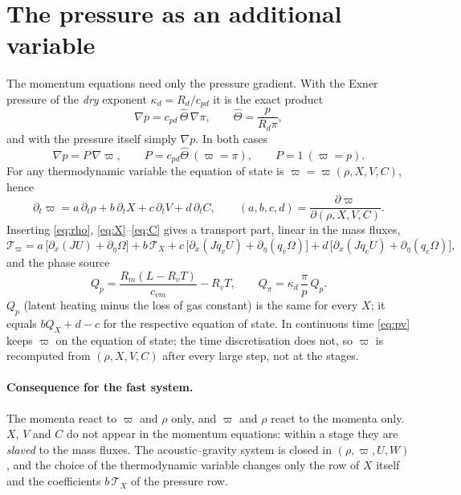 \documentclass[11pt,a4paper]{article}
\newcommand{\pv}{\varpi}      %
\begin{document}
\section{The pressure as an additional variable}\label{sec:pressure}
The momentum equations need only the pressure gradient. With the Exner pressure of the \emph{dry}
exponent $\kappa_d=R_d/c_{pd}$ it is the exact product
\[
\nabla p=c_{pd}\,\hat\Theta\,\nabla\pi,\qquad\hat\Theta=\frac p{R_d\pi},
\]
and with the pressure itself simply $\nabla p$. In both cases
\[
\nabla p=P\,\nabla\pv,\qquad P=c_{pd}\hat\Theta\ (\pv=\pi),\qquad P=1\ (\pv=p).
\]
For any thermodynamic variable the equation of state is $\pv=\pv(\rho,X,V,C)$, hence
\begin{equation}
\partial_t\pv=a\,\partial_t\rho+b\,\partial_tX+c\,\partial_tV+d\,\partial_tC,\qquad
(a,b,c,d)=\frac{\partial\pv}{\partial(\rho,X,V,C)} .\label{eq:chain}
\end{equation}
Inserting \eqref{eq:rho}, \eqref{eq:X}--\eqref{eq:C} gives a transport part, linear in the mass fluxes,
\[
\mathcal T_\pv=a\,\big[\partial_x(JU)+\partial_\eta\Omega\big]+b\,\mathcal T_X+c\,\big[\partial_x(Jq_vU)+\partial_\eta(q_v\Omega)\big]
+d\,\big[\partial_x(Jq_cU)+\partial_\eta(q_c\Omega)\big],
\]
and the phase source
\[
Q_p=\frac{R_m(L-R_vT)}{c_{vm}}-R_vT,\qquad Q_\pi=\kappa_d\,\frac\pi p\,Q_p .
\]
$Q_p$ (latent heating minus the loss of gas constant) is the same for every $X$; it equals
$bQ_X+d-c$ for the respective equation of state. In continuous time \eqref{eq:pv} keeps $\pv$ on the
equation of state; the time discretisation does not, so $\pv$ is recomputed from $(\rho,X,V,C)$ after
every large step, not at the stages.

\paragraph{Consequence for the fast system.} The momenta react to $\pv$ and $\rho$ only, and $\pv$ and
$\rho$ react to the momenta only. $X$, $V$ and $C$ do not appear in the momentum equations: within a
stage they are \emph{slaved} to the mass fluxes. The acoustic--gravity system is closed in
$(\rho,\pv,U,W)$, and the choice of the thermodynamic variable changes only the row of $X$ itself
and the coefficients $b\,\mathcal T_X$ of the pressure row.

\end{document}
